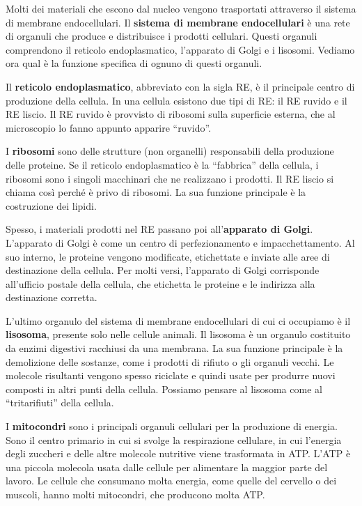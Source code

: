 \documentclass[a4paper]{article}
\begin{document}
Molti dei materiali che escono dal nucleo vengono trasportati attraverso il sistema di
membrane endocellulari. Il \textbf{sistema di membrane endocellulari} è una rete di organuli che
produce e distribuisce i prodotti cellulari. Questi organuli comprendono il reticolo
endoplasmatico, l'apparato di Golgi e i lisosomi. Vediamo ora qual è la funzione specifica di
ognuno di questi organuli.

Il \textbf{reticolo endoplasmatico}, abbreviato con la sigla RE, è il principale centro di produzione
della cellula. In una cellula esistono due tipi di RE: il RE ruvido e il RE liscio. Il RE ruvido è
provvisto di ribosomi sulla superficie esterna, che al microscopio lo fanno appunto apparire
“ruvido”.

I \textbf{ribosomi} sono delle strutture (non organelli) responsabili della produzione delle proteine. Se il reticolo
endoplasmatico è la “fabbrica” della cellula, i ribosomi sono i singoli macchinari che ne
realizzano i prodotti. Il RE liscio si chiama così perché è privo di ribosomi. La sua funzione
principale è la costruzione dei lipidi.

Spesso, i materiali prodotti nel RE passano poi all'\textbf{apparato di Golgi}. L'apparato di Golgi è
come un centro di perfezionamento e impacchettamento. Al suo interno, le proteine
vengono modificate, etichettate e inviate alle aree di destinazione della cellula. Per molti
versi, l'apparato di Golgi corrisponde all'ufficio postale della cellula, che etichetta le proteine
e le indirizza alla destinazione corretta.

L'ultimo organulo del sistema di membrane endocellulari di cui ci occupiamo è il \textbf{lisosoma},
presente solo nelle cellule animali. Il lisosoma è un organulo costituito da enzimi digestivi
racchiusi da una membrana. La sua funzione principale è la demolizione delle sostanze,
come i prodotti di rifiuto o gli organuli vecchi. Le molecole risultanti vengono spesso riciclate
e quindi usate per produrre nuovi composti in altri punti della cellula. Possiamo pensare al
lisosoma come al “tritarifiuti” della cellula.

I \textbf{mitocondri} sono i principali organuli cellulari per la produzione di energia. Sono il centro
primario in cui si svolge la respirazione cellulare, in cui l'energia degli zuccheri e delle altre
molecole nutritive viene trasformata in ATP. L'ATP è una piccola molecola usata dalle cellule
per alimentare la maggior parte del lavoro. Le cellule che consumano molta energia, come
quelle del cervello o dei muscoli, hanno molti mitocondri, che producono molta ATP.
\end{document}
